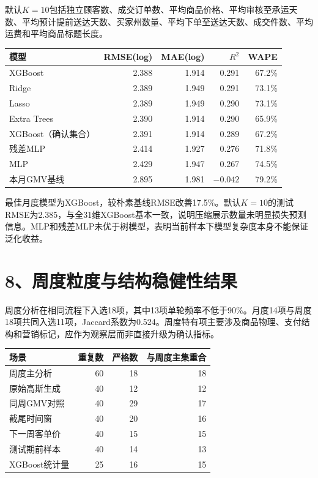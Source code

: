 \documentclass[UTF8,12pt,a4paper]{ctexart}
\begin{document}
默认$K=10$包括独立顾客数、成交订单数、平均商品价格、平均审核至承运天数、平均预计提前送达天数、买家州数量、平均下单至送达天数、成交件数、平均运费和平均商品标题长度。

\begin{center}
\scriptsize
\renewcommand{\arraystretch}{1.12}
\begin{tabular}{lrrrr}
\toprule
模型 & RMSE(log) & MAE(log) & $R^2$ & WAPE\\
\midrule
XGBoost & 2.388 & 1.914 & 0.291 & 67.2\%\\
Ridge & 2.389 & 1.949 & 0.291 & 73.1\%\\
Lasso & 2.389 & 1.949 & 0.290 & 73.1\%\\
Extra Trees & 2.390 & 1.914 & 0.290 & 65.9\%\\
XGBoost（确认集合） & 2.391 & 1.914 & 0.289 & 67.2\%\\
残差MLP & 2.414 & 1.927 & 0.276 & 71.8\%\\
MLP & 2.429 & 1.947 & 0.267 & 74.5\%\\
本月GMV基线 & 2.895 & 1.981 & $-0.042$ & 79.2\%\\
\bottomrule
\end{tabular}
\end{center}

最佳月度模型为XGBoost，较朴素基线RMSE改善17.5\%。默认$K=10$的测试RMSE为2.385，与全31维XGBoost基本一致，说明压缩展示数量未明显损失预测信息。MLP和残差MLP未优于树模型，表明当前样本下模型复杂度本身不能保证泛化收益。

\newpage
\section*{8、周度粒度与结构稳健性结果}

周度分析在相同流程下入选18项，其中13项单轮频率不低于90\%。月度14项与周度18项共同入选11项，Jaccard系数为0.524。周度特有项主要涉及商品物理、支付结构和营销标记，应作为观察层而非直接升级为确认指标。

\begin{center}
\scriptsize
\renewcommand{\arraystretch}{1.15}
\begin{tabular}{lrrr}
\toprule
场景 & 重复数 & 严格数 & 与周度主集重合\\
\midrule
周度主分析 & 60 & 18 & 18\\
原始高斯生成 & 40 & 12 & 12\\
同周GMV对照 & 40 & 29 & 17\\
截尾时间窗 & 40 & 20 & 16\\
下一周客单价 & 40 & 15 & 15\\
测试期前样本 & 40 & 14 & 13\\
XGBoost统计量 & 25 & 16 & 15\\
\bottomrule
\end{tabular}
\end{center}
\end{document}
